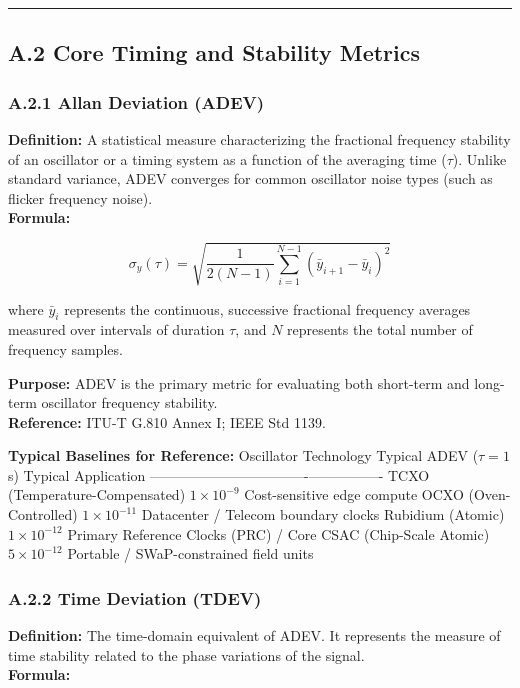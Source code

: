 \documentclass[
]{article}
\begin{document}
\begin{center}\rule{0.5\linewidth}{0.5pt}\end{center}

\subsection{A.2 Core Timing and Stability
Metrics}\label{a.2-core-timing-and-stability-metrics}

\subsubsection{A.2.1 Allan Deviation
(ADEV)}\label{a.2.1-allan-deviation-adev}

\textbf{Definition:} A statistical measure characterizing the fractional
frequency stability of an oscillator or a timing system as a function of
the averaging time (\(\tau\)). Unlike standard variance, ADEV converges
for common oscillator noise types (such as flicker frequency noise).\\
\textbf{Formula:}

\[\sigma_y(\tau) = \sqrt{ \frac{1}{2(N-1)} \sum_{i=1}^{N-1} (\bar{y}_{i+1} - \bar{y}_i)^2 }\]

where \(\bar{y}_i\) represents the continuous, successive fractional
frequency averages measured over intervals of duration \(\tau\), and
\(N\) represents the total number of frequency samples.

\textbf{Purpose:} ADEV is the primary metric for evaluating both
short-term and long-term oscillator frequency stability.\\
\textbf{Reference:} ITU-T G.810 Annex I; IEEE Std 1139.

\textbf{Typical Baselines for Reference:} Oscillator Technology Typical
ADEV (\(\tau = 1\) s) Typical Application
----------------------------------\/---------------- TCXO
(Temperature-Compensated) \(1 \times 10^{-9}\) Cost-sensitive edge
compute OCXO (Oven-Controlled) \(1 \times 10^{-11}\) Datacenter /
Telecom boundary clocks Rubidium (Atomic) \(1 \times 10^{-12}\) Primary
Reference Clocks (PRC) / Core CSAC (Chip-Scale Atomic)
\(5 \times 10^{-12}\) Portable / SWaP-constrained field units

\subsubsection{A.2.2 Time Deviation
(TDEV)}\label{a.2.2-time-deviation-tdev}

\textbf{Definition:} The time-domain equivalent of ADEV. It represents
the measure of time stability related to the phase variations of the
signal.\\
\textbf{Formula:}
\end{document}
